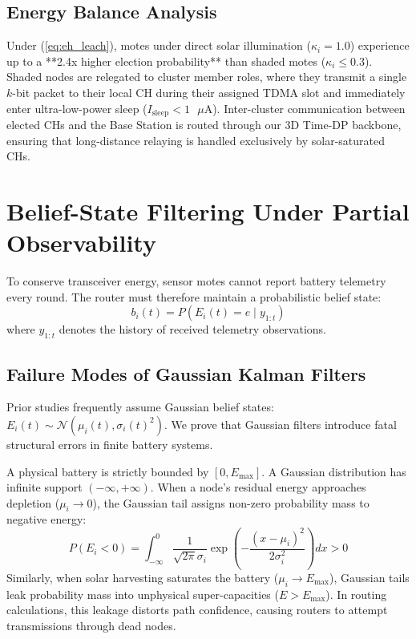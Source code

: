 \documentclass[journal]{IEEEtran}
\begin{document}
\subsection{Energy Balance Analysis}
Under (\ref{eq:eh_leach}), motes under direct solar illumination ($\kappa_i = 1.0$) experience up to a **2.4x higher election probability** than shaded motes ($\kappa_i \le 0.3$). Shaded nodes are relegated to cluster member roles, where they transmit a single $k$-bit packet to their local CH during their assigned TDMA slot and immediately enter ultra-low-power sleep ($I_{\text{sleep}} < 1\text{ }\mu\text{A}$). Inter-cluster communication between elected CHs and the Base Station is routed through our 3D Time-DP backbone, ensuring that long-distance relaying is handled exclusively by solar-saturated CHs.

\section{Belief-State Filtering Under Partial Observability}
To conserve transceiver energy, sensor motes cannot report battery telemetry every round. The router must therefore maintain a probabilistic belief state:
\begin{equation}
b_i(t) = P(E_i(t) = e \mid y_{1:t})
\end{equation}
where $y_{1:t}$ denotes the history of received telemetry observations.

\subsection{Failure Modes of Gaussian Kalman Filters}
Prior studies frequently assume Gaussian belief states: $E_i(t) \sim \mathcal{N}(\mu_i(t), \sigma_i(t)^2)$. We prove that Gaussian filters introduce fatal structural errors in finite battery systems.

A physical battery is strictly bounded by $[0, E_{\max}]$. A Gaussian distribution has infinite support $(-\infty, +\infty)$. When a node's residual energy approaches depletion ($\mu_i \to 0$), the Gaussian tail assigns non-zero probability mass to negative energy:
\begin{equation}
P(E_i < 0) = \int_{-\infty}^0 \frac{1}{\sqrt{2\pi}\sigma_i} \exp\left( -\frac{(x - \mu_i)^2}{2\sigma_i^2} \right) dx > 0
\end{equation}
Similarly, when solar harvesting saturates the battery ($\mu_i \to E_{\max}$), Gaussian tails leak probability mass into unphysical super-capacities ($E > E_{\max}$). In routing calculations, this leakage distorts path confidence, causing routers to attempt transmissions through dead nodes.
\end{document}
